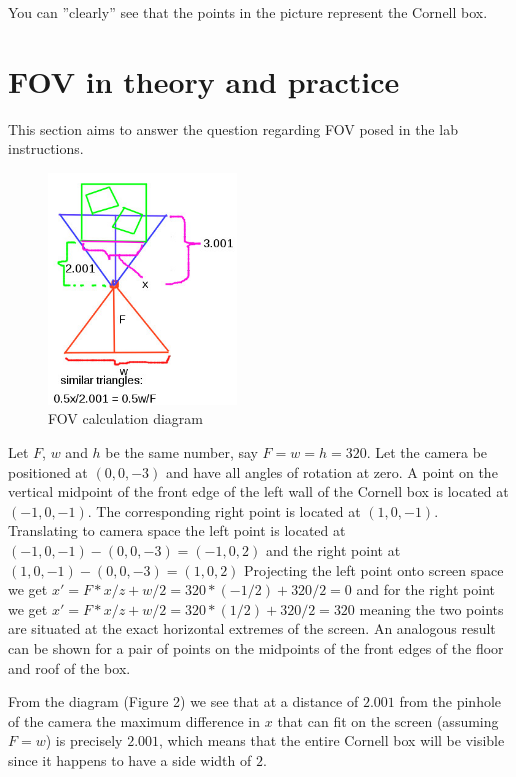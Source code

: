 \documentclass[a4paper,11pt]{article}
\begin{document}
\bigskip
\bigskip
\noindent You can ''clearly'' see that the points in the picture represent the Cornell box.

\section*{FOV in theory and practice}
This section aims to answer the question regarding FOV posed in the lab instructions.

\begin{figure}[H]
\begin{center}
\includegraphics[width=5cm]{camerapos.jpg}
\caption{FOV calculation diagram}
\end{center}
\end{figure}

\noindent Let $F$, $w$ and $h$ be the same number, say $F = w = h = 320$. Let the camera be
positioned at $(0,0,-3)$ and have all angles of rotation at zero. A point on the vertical midpoint
of the front edge of the left wall of the Cornell box is located at $(-1,0,-1)$. The corresponding
right point is located at $(1,0,-1)$. Translating to camera space the left point is located at
$(-1,0,-1) - (0,0,-3) = (-1,0,2)$ and the right point at $(1,0,-1) - (0,0,-3) = (1,0,2)$
Projecting the left point onto screen space we get $x' = F*x/z + w/2 = 320*(-1/2) + 320/2 = 0$ and
for the right point we get $x' = F*x/z + w/2 = 320*(1/2) + 320/2 = 320$ meaning the two points are situated
at the exact horizontal extremes of the screen. An analogous result can be shown for a pair of points on the
midpoints of the front edges of the floor and roof of the box.

From the diagram (Figure 2) we see that at a distance of $2.001$ from the pinhole of the camera the
maximum difference in $x$ that can fit on the screen (assuming $F = w$) is precisely $2.001$, which
means that the entire Cornell box will be visible since it happens to have a side width of $2$.
\end{document}
